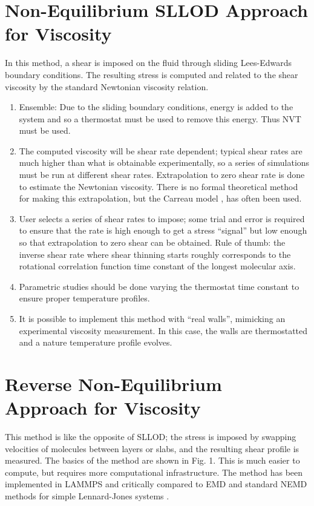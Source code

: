 \documentclass[9pt]{livecoms}
\begin{document}
\section{Non-Equilibrium SLLOD Approach for Viscosity}

In this method, a shear is imposed on the fluid through sliding Lees-Edwards boundary conditions. The resulting stress is computed and related to the shear viscosity by the standard Newtonian viscosity relation.

\begin{enumerate}
	\item Ensemble: Due to the sliding boundary conditions, energy is added to the system and so a thermostat must be used to remove this energy. Thus NVT must be used.
	\item The computed viscosity will be shear rate dependent; typical shear rates are much higher than what is obtainable experimentally, so a series of simulations must be run at different shear rates. Extrapolation to zero shear rate is done to estimate the Newtonian viscosity. There is no formal theoretical method for making this extrapolation, but the Carreau model \cite{Hieber1992,Kioupis2000}, has often been used.
	\item User selects a series of shear rates to impose; some trial and error is required to ensure that the rate is high enough to get a stress “signal” but low enough so that extrapolation to zero shear can be obtained. Rule of thumb: the inverse shear rate where shear thinning starts roughly corresponds to the rotational correlation function time constant of the longest molecular axis.
	\item Parametric studies should be done varying the thermostat time constant to ensure proper temperature profiles. 
	\item It is possible to implement this method with “real walls”, mimicking an experimental viscosity measurement. In this case, the walls are thermostatted and a nature temperature profile evolves.
\end{enumerate}

\section{Reverse Non-Equilibrium Approach for Viscosity}

This method is like the opposite of SLLOD; the stress is imposed by swapping velocities of molecules between layers or slabs, and the resulting shear profile is measured. The basics of the method are shown in Fig. 1. This is much easier to compute, but requires more computational infrastructure. The method \cite{Muller1999} has been implemented in LAMMPS \cite{LAMMPS} and critically compared to EMD and standard NEMD methods for simple Lennard-Jones systems \cite{Tenney2010}. 
 
\end{document}
